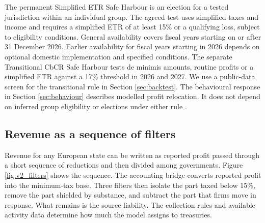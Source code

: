 \documentclass[11pt,a4paper]{article}
\begin{document}
The permanent Simplified ETR Safe Harbour is an election for a tested jurisdiction within an individual group. The agreed test uses simplified taxes and income and requires a simplified ETR of at least 15\% or a qualifying loss, subject to eligibility conditions. General availability covers fiscal years starting on or after 31 December 2026. Earlier availability for fiscal years starting in 2026 depends on optional domestic implementation and specified conditions. The separate Transitional CbCR Safe Harbour tests de minimis amounts, routine profits or a simplified ETR against a 17\% threshold in 2026 and 2027. We use a public-data screen for the transitional rule in Section \ref{sec:backtest}. The behavioural response in Section \ref{sec:behaviour} describes modelled profit relocation. It does not depend on inferred group eligibility or elections under either rule \citep{oecd2026}.

\subsection{Revenue as a sequence of filters}\label{sec:filters}

Revenue for any European state can be written as reported profit passed through a short sequence of reductions and then divided among governments. Figure \ref{fig:v2_filters} shows the sequence. The accounting bridge converts reported profit into the minimum-tax base. Three filters then isolate the part taxed below 15\%, remove the part shielded by substance, and subtract the part that firms move in response. What remains is the source liability. The collection rules and available activity data determine how much the model assigns to treasuries.


\end{document}
